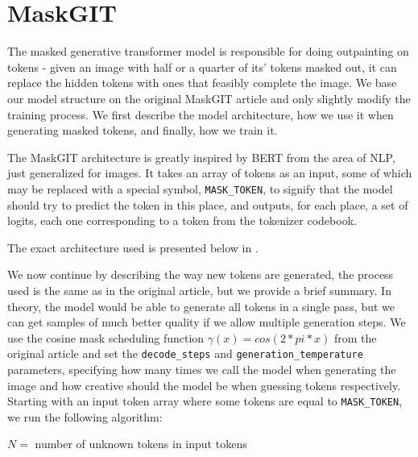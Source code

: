 \section{MaskGIT}

The masked generative transformer model \citep{maskgit} is responsible for doing outpainting on tokens - given an image with half or a quarter of its' tokens masked out, it can replace the hidden tokens with ones that feasibly complete the image. We base our model structure on the original MaskGIT article and only slightly modify the training process. We first describe the model architecture, how we use it when generating masked tokens, and finally, how we train it.

The MaskGIT architecture is greatly inspired by BERT \citep{BERT} from the area of NLP, just generalized for images. It takes an array of tokens as an input, some of which may be replaced with a special symbol, \texttt{MASK\_TOKEN}, to signify that the model should try to predict the token in this place, and outputs, for each place, a set of logits, each one corresponding to a token from the tokenizer codebook.

The exact architecture used is presented below in .



We now continue by describing the way new tokens are generated, the process used is the same as in the original article, but we provide a brief summary. In theory, the model would be able to generate all tokens in a single pass, but we can get samples of much better quality if we allow multiple generation steps. We use the cosine mask scheduling function $\gamma(x) = cos(2*pi*x)$ from the original article and set the \texttt{decode\_steps} and \texttt{generation\_temperature} parameters, specifying how many times we call the model when generating the image and how creative should the model be when guessing tokens respectively.  Starting with an input token array where some tokens are equal to \texttt{MASK\_TOKEN}, we run the following algorithm:

$N =$ number of unknown tokens in input tokens

